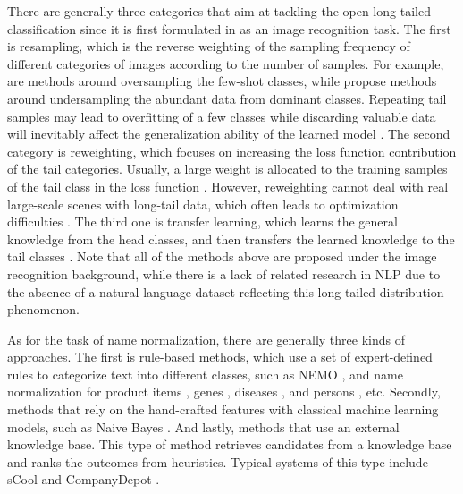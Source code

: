 \documentclass{article}
\begin{document}
There are generally three categories that aim at tackling the open long-tailed classification since it is first formulated in  \cite{liu2019large} as an image recognition task. The first is resampling, which is the reverse weighting of the sampling frequency of different categories of images according to the number of samples. For example,  \cite{shen2016relay,buda2018systematic,byrd2019effect} are methods around oversampling the few-shot classes, while  \cite{buda2018systematic,japkowicz2002class} propose methods around undersampling the abundant data from dominant classes. Repeating tail samples may lead to overfitting of a few classes \cite{chawla2002smote,cui2019class} while discarding valuable data will inevitably affect the generalization ability of the learned model  \cite{zhou2020bbn}. The second category is reweighting, which focuses on increasing the loss function contribution of the tail categories. Usually, a large weight is allocated to the training samples of the tail class in the loss function  \cite{huang2016learning}. However, reweighting cannot deal with real large-scale scenes with long-tail data, which often leads to optimization difficulties  \cite{mikolov2013distributed}. The third one is transfer learning, which learns the general knowledge from the head classes, and then transfers the learned knowledge to the tail classes  \cite{liu2020deep,xiang2020learning}. Note that all of the methods above are proposed under the image recognition background, while there is a lack of related research in NLP due to the absence of a natural language dataset reflecting this long-tailed distribution phenomenon. 

As for the task of name normalization, there are generally three kinds of approaches. The first is rule-based methods, which use a set of expert-defined rules to categorize text into different classes, such as NEMO  \cite{jonnalagadda2010nemo}, and name normalization for product items  \cite{borkovsky2003item}, genes  \cite{wermter2009high}, diseases  \cite{leaman2013dnorm}, and persons  \cite{magdy2007arabic}, etc. 
Secondly, methods that rely on the hand-crafted features with classical machine learning models, such as Naive Bayes  \cite{maron1961automatic}.
And lastly, methods that use an external knowledge base. This type of method retrieves candidates from a knowledge base and ranks the outcomes from heuristics. Typical systems of this type include sCool  \cite{jacob2014scool} and CompanyDepot  \cite{liu2016companydepot}. 
\end{document}
